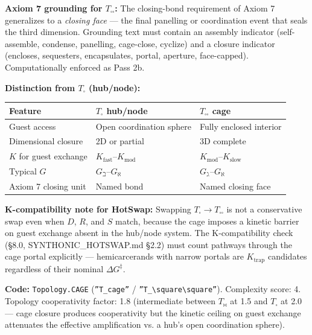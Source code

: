 \documentclass[12pt,a4paper]{article}
\begin{document}
\textbf{Axiom 7 grounding for $T_{\square\square}$:} The closing-bond requirement of Axiom 7 generalizes to a \emph{closing face} --- the final panelling or coordination event that seals the third dimension. Grounding text must contain an assembly indicator (self-assemble, condense, panelling, cage-close, cyclize) and a closure indicator (encloses, sequesters, encapsulates, portal, aperture, face-capped). Computationally enforced as Pass 2b.

\textbf{Distinction from $T_{\square}$ (hub/node):}

\begin{table}[htbp]
\centering
\small
{}
\begin{tabularx}{\textwidth}{>{\centering\arraybackslash}X >{\centering\arraybackslash}X >{\centering\arraybackslash}X}
\toprule
\rowcolor{gray!25}\textbf{Feature} & \textbf{$T_{\square}$ hub/node} & \textbf{$T_{\square\square}$ cage} \\
\midrule
\rowcolors{1}{white}{gray!10}
Guest access & Open coordination sphere & Fully enclosed interior \\
Dimensional closure & 2D or partial & 3D complete \\
$K$ for guest exchange & $K_{\text{fast}}$--$K_{\text{mod}}$ & $K_{\text{mod}}$--$K_{\text{slow}}$ \\
Typical $G$ & $G_{\beth}$--$G_{\aleph}$ & $G_{\gimel}$--$G_{\aleph}$ \\
Axiom 7 closing unit & Named bond & Named closing face \\
\bottomrule
\end{tabularx}
\end{table}

\textbf{K-compatibility note for HotSwap:} Swapping $T_{\square} \to T_{\square\square}$ is not a conservative swap even when $D$, $R$, and $S$ match, because the cage imposes a kinetic barrier on guest exchange absent in the hub/node system. The K-compatibility check (§8.0, SYNTHONIC\_HOTSWAP.md §2.2) must count pathways through the cage portal explicitly --- hemicarcerands with narrow portals are $K_{\text{trap}}$ candidates regardless of their nominal $\Delta G^{\ddagger}$.

\textbf{Code:} \texttt{Topology.CAGE} (\texttt{''T\_cage''} / \texttt{''T\_\textbackslash{}square\textbackslash{}square''}). Complexity score: 4. Topology cooperativity factor: 1.8 (intermediate between $T_{\bowtie}$ at 1.5 and $T_{\square}$ at 2.0 --- cage closure produces cooperativity but the kinetic ceiling on guest exchange attenuates the effective amplification vs. a hub's open coordination sphere).
\end{document}
